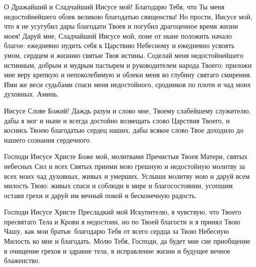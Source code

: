О Дражайший и Сладчайший Иисусе мой! Благодарю Тебя, что Ты меня недостойнейшего облек великою благодатью священства! Но прости, Иисусе мой, что я не усугубил дары благодати Твоея и погубил драгоценное время жизни моея! Даруй мне, Сладчайший Иисусе мой, поне от ныне положить начало благое: ежедневно нудить себя к Царствию Небесному и ежедневно усвоять умом, сердцем и жизнию святые Твоя истины. Соделай меня недостойнейшего истинным, добрым и мудрым пастырем и руководителем народа Твоего; приложи мне веру крепкую и непоколебимую и облеки меня во глубину святаго смирения. Ими же веси судьбами спаси меня недостойного, сродников по плоти и чад моих духовных. Аминь.


\mychapterending





Иисусе Слове Божий! Даждь разум и слово мне, Твоему слабейшему служителю, дабы я мог и ныне и всегда достойно возвещать слово Царствия Твоего, и коснись Твоею благодатью сердец наших, дабы всякое слово Твое доходило до нашего сознания сердечного.


Господи Иисусе Христе Боже мой, молитвами Пречистыя Твоея Матери, святых небесных Сил и всех Святых приими мою грешную и недостойную молитву за всех моих чад духовных, живых и умерших. Услыши молитву мою и даруй всем милость Твою: живых спаси и соблюди в мире и благосостоянии, усопшим остави грехи и даруй им вечный покой и бесконечную радость.





\mychapterending





Господи Иисусе Христе Пресладкий мой Искупителю, я чувствую, что Твоего пресвятаго Тела и Крови я недостоин, но по Твоей благости и я принял Твою Чашу, как мои братья: благодарю Тебя от всего сердца за Твою Небесную Милость ко мне и благодать. Молю Тебя, Господи, да будет мне сие приобщение в очищение грехов и здравие тела, в исправление жизни и будущее вечное блаженство.


\mychapterending





